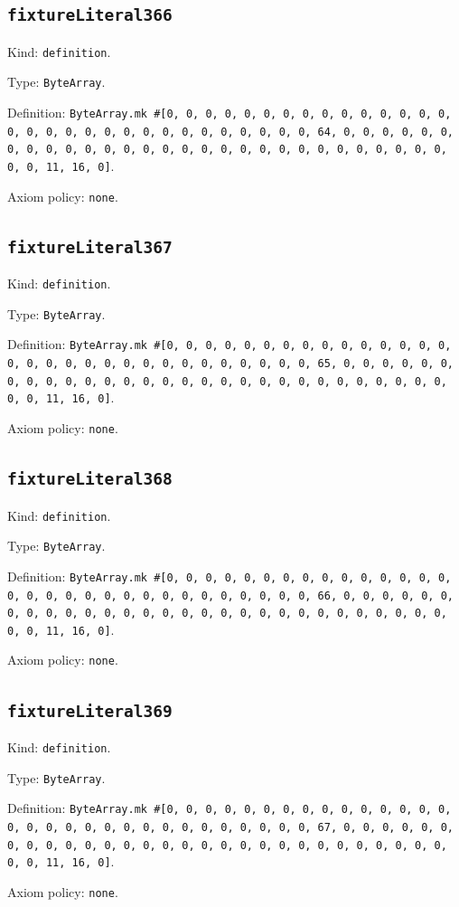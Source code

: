 \documentclass[11pt]{article}
\begin{document}
\subsection*{\texttt{fixtureLiteral366}}
\noindent Kind: \texttt{definition}.\par
\noindent Type: \texttt{ByteArray}.\par
\noindent Definition: \texttt{ByteArray.mk \#[0, 0, 0, 0, 0, 0, 0, 0, 0, 0, 0, 0, 0, 0, 0, 0, 0, 0, 0, 0, 0, 0, 0, 0, 0, 0, 0, 0, 0, 0, 0, 64, 0, 0, 0, 0, 0, 0, 0, 0, 0, 0, 0, 0, 0, 0, 0, 0, 0, 0, 0, 0, 0, 0, 0, 0, 0, 0, 0, 0, 0, 0, 0, 11, 16, 0]}.\par
\noindent Axiom policy: \texttt{none}.\par
\subsection*{\texttt{fixtureLiteral367}}
\noindent Kind: \texttt{definition}.\par
\noindent Type: \texttt{ByteArray}.\par
\noindent Definition: \texttt{ByteArray.mk \#[0, 0, 0, 0, 0, 0, 0, 0, 0, 0, 0, 0, 0, 0, 0, 0, 0, 0, 0, 0, 0, 0, 0, 0, 0, 0, 0, 0, 0, 0, 0, 65, 0, 0, 0, 0, 0, 0, 0, 0, 0, 0, 0, 0, 0, 0, 0, 0, 0, 0, 0, 0, 0, 0, 0, 0, 0, 0, 0, 0, 0, 0, 0, 11, 16, 0]}.\par
\noindent Axiom policy: \texttt{none}.\par
\subsection*{\texttt{fixtureLiteral368}}
\noindent Kind: \texttt{definition}.\par
\noindent Type: \texttt{ByteArray}.\par
\noindent Definition: \texttt{ByteArray.mk \#[0, 0, 0, 0, 0, 0, 0, 0, 0, 0, 0, 0, 0, 0, 0, 0, 0, 0, 0, 0, 0, 0, 0, 0, 0, 0, 0, 0, 0, 0, 0, 66, 0, 0, 0, 0, 0, 0, 0, 0, 0, 0, 0, 0, 0, 0, 0, 0, 0, 0, 0, 0, 0, 0, 0, 0, 0, 0, 0, 0, 0, 0, 0, 11, 16, 0]}.\par
\noindent Axiom policy: \texttt{none}.\par
\subsection*{\texttt{fixtureLiteral369}}
\noindent Kind: \texttt{definition}.\par
\noindent Type: \texttt{ByteArray}.\par
\noindent Definition: \texttt{ByteArray.mk \#[0, 0, 0, 0, 0, 0, 0, 0, 0, 0, 0, 0, 0, 0, 0, 0, 0, 0, 0, 0, 0, 0, 0, 0, 0, 0, 0, 0, 0, 0, 0, 67, 0, 0, 0, 0, 0, 0, 0, 0, 0, 0, 0, 0, 0, 0, 0, 0, 0, 0, 0, 0, 0, 0, 0, 0, 0, 0, 0, 0, 0, 0, 0, 11, 16, 0]}.\par
\noindent Axiom policy: \texttt{none}.\par
\end{document}
